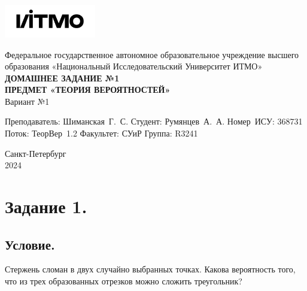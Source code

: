 \documentclass[a4paper, 12pt]{article}
\begin{document}
    \begin{titlepage}

        \begin{center}
        \includegraphics[width=0.3\textwidth]{itmo.png} %
        \vfill

        Федеральное государственное автономное образовательное учреждение высшего образования
        «Национальный Исследовательский Университет ИТМО»\\

        \vfill
        {\large\bf ДОМАШНЕЕ ЗАДАНИЕ №1}\\
        {\large\bf ПРЕДМЕТ «ТЕОРИЯ ВЕРОЯТНОСТЕЙ»}\\
        Вариант №1
        \vfill

        \begin{flushright}
            \begin{minipage}{.45\textwidth}
            {
                \hbox{Преподаватель:}
                \hbox{Шиманская Г. С.}
                \hbox{Студент:}
                \hbox{Румянцев А. А.}
                \hbox{}
                \hbox{Номер ИСУ:}
                \hbox{368731}
                \hbox{Поток:}
                \hbox{ТеорВер 1.2}
                \hbox{Факультет:}
                \hbox{СУиР}
                \hbox{Группа:}
                \hbox{R3241}
            }
            \end{minipage}
        \end{flushright}

        \vfill

        Санкт-Петербург\\
        2024
        \end{center}
    \end{titlepage}

    \tableofcontents

    \newpage
    \section{Задание 1.}
    \subsection{Условие.}
    Стержень сломан в двух случайно выбранных точках. Какова вероятность того, что из
    трех образованных отрезков можно сложить треугольник?
\end{document}
